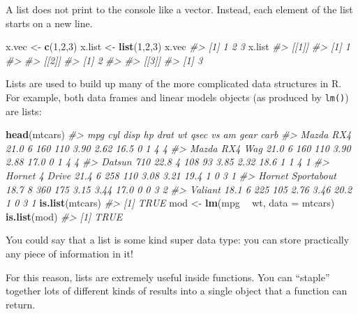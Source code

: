 \documentclass[]{book}
\newenvironment{Shaded}{\begin{snugshade}}{\end{snugshade}}
\newcommand{\KeywordTok}[1]{\textcolor[rgb]{0.13,0.29,0.53}{\textbf{#1}}}
\newcommand{\DataTypeTok}[1]{\textcolor[rgb]{0.13,0.29,0.53}{#1}}
\newcommand{\DecValTok}[1]{\textcolor[rgb]{0.00,0.00,0.81}{#1}}
\newcommand{\StringTok}[1]{\textcolor[rgb]{0.31,0.60,0.02}{#1}}
\newcommand{\CommentTok}[1]{\textcolor[rgb]{0.56,0.35,0.01}{\textit{#1}}}
\newcommand{\OperatorTok}[1]{\textcolor[rgb]{0.81,0.36,0.00}{\textbf{#1}}}
\newcommand{\NormalTok}[1]{#1}
\begin{document}
A list does not print to the console like a vector. Instead, each
element of the list starts on a new line.

\begin{Shaded}
\begin{Highlighting}[]
\NormalTok{x.vec <-}\StringTok{ }\KeywordTok{c}\NormalTok{(}\DecValTok{1}\NormalTok{,}\DecValTok{2}\NormalTok{,}\DecValTok{3}\NormalTok{)}
\NormalTok{x.list <-}\StringTok{ }\KeywordTok{list}\NormalTok{(}\DecValTok{1}\NormalTok{,}\DecValTok{2}\NormalTok{,}\DecValTok{3}\NormalTok{)}
\NormalTok{x.vec}
\CommentTok{#> [1] 1 2 3}
\NormalTok{x.list}
\CommentTok{#> [[1]]}
\CommentTok{#> [1] 1}
\CommentTok{#> }
\CommentTok{#> [[2]]}
\CommentTok{#> [1] 2}
\CommentTok{#> }
\CommentTok{#> [[3]]}
\CommentTok{#> [1] 3}
\end{Highlighting}
\end{Shaded}

Lists are used to build up many of the more complicated data structures
in R. For example, both data frames and linear models objects (as
produced by \texttt{lm()}) are lists:

\begin{Shaded}
\begin{Highlighting}[]
\KeywordTok{head}\NormalTok{(mtcars)}
\CommentTok{#>                    mpg cyl disp  hp drat   wt qsec vs am gear carb}
\CommentTok{#> Mazda RX4         21.0   6  160 110 3.90 2.62 16.5  0  1    4    4}
\CommentTok{#> Mazda RX4 Wag     21.0   6  160 110 3.90 2.88 17.0  0  1    4    4}
\CommentTok{#> Datsun 710        22.8   4  108  93 3.85 2.32 18.6  1  1    4    1}
\CommentTok{#> Hornet 4 Drive    21.4   6  258 110 3.08 3.21 19.4  1  0    3    1}
\CommentTok{#> Hornet Sportabout 18.7   8  360 175 3.15 3.44 17.0  0  0    3    2}
\CommentTok{#> Valiant           18.1   6  225 105 2.76 3.46 20.2  1  0    3    1}
\KeywordTok{is.list}\NormalTok{(mtcars)}
\CommentTok{#> [1] TRUE}
\NormalTok{mod <-}\StringTok{ }\KeywordTok{lm}\NormalTok{(mpg }\OperatorTok{~}\StringTok{ }\NormalTok{wt, }\DataTypeTok{data =}\NormalTok{ mtcars)}
\KeywordTok{is.list}\NormalTok{(mod)}
\CommentTok{#> [1] TRUE}
\end{Highlighting}
\end{Shaded}

You could say that a list is some kind super data type: you can store
practically any piece of information in it!

For this reason, lists are extremely useful inside functions. You can
``staple'' together lots of different kinds of results into a single
object that a function can return.
\end{document}
